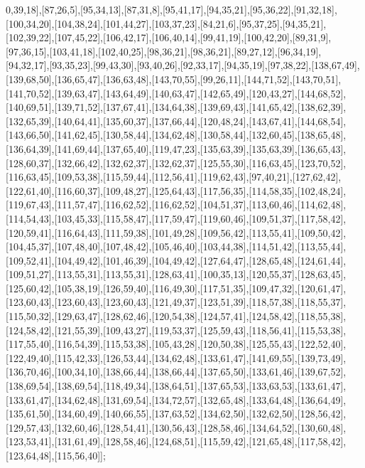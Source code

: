 0,39,18],[87,26,5],[95,34,13],[87,31,8],[95,41,17],[94,35,21],[95,36,22],[91,32,18],[100,34,20],[104,38,24],[101,44,27],[103,37,23],[84,21,6],[95,37,25],[94,35,21],[102,39,22],[107,45,22],[106,42,17],[106,40,14],[99,41,19],[100,42,20],[89,31,9],[97,36,15],[103,41,18],[102,40,25],[98,36,21],[98,36,21],[89,27,12],[96,34,19],[94,32,17],[93,35,23],[99,43,30],[93,40,26],[92,33,17],[94,35,19],[97,38,22],[138,67,49],[139,68,50],[136,65,47],[136,63,48],[143,70,55],[99,26,11],[144,71,52],[143,70,51],[141,70,52],[139,63,47],[143,64,49],[140,63,47],[142,65,49],[120,43,27],[144,68,52],[140,69,51],[139,71,52],[137,67,41],[134,64,38],[139,69,43],[141,65,42],[138,62,39],[132,65,39],[140,64,41],[135,60,37],[137,66,44],[120,48,24],[143,67,41],[144,68,54],[143,66,50],[141,62,45],[130,58,44],[134,62,48],[130,58,44],[132,60,45],[138,65,48],[136,64,39],[141,69,44],[137,65,40],[119,47,23],[135,63,39],[135,63,39],[136,65,43],[128,60,37],[132,66,42],[132,62,37],[132,62,37],[125,55,30],[116,63,45],[123,70,52],[116,63,45],[109,53,38],[115,59,44],[112,56,41],[119,62,43],[97,40,21],[127,62,42],[122,61,40],[116,60,37],[109,48,27],[125,64,43],[117,56,35],[114,58,35],[102,48,24],[119,67,43],[111,57,47],[116,62,52],[116,62,52],[104,51,37],[113,60,46],[114,62,48],[114,54,43],[103,45,33],[115,58,47],[117,59,47],[119,60,46],[109,51,37],[117,58,42],[120,59,41],[116,64,43],[111,59,38],[101,49,28],[109,56,42],[113,55,41],[109,50,42],[104,45,37],[107,48,40],[107,48,42],[105,46,40],[103,44,38],[114,51,42],[113,55,44],[109,52,41],[104,49,42],[101,46,39],[104,49,42],[127,64,47],[128,65,48],[124,61,44],[109,51,27],[113,55,31],[113,55,31],[128,63,41],[100,35,13],[120,55,37],[128,63,45],[125,60,42],[105,38,19],[126,59,40],[116,49,30],[117,51,35],[109,47,32],[120,61,47],[123,60,43],[123,60,43],[123,60,43],[121,49,37],[123,51,39],[118,57,38],[118,55,37],[115,50,32],[129,63,47],[128,62,46],[120,54,38],[124,57,41],[124,58,42],[118,55,38],[124,58,42],[121,55,39],[109,43,27],[119,53,37],[125,59,43],[118,56,41],[115,53,38],[117,55,40],[116,54,39],[115,53,38],[105,43,28],[120,50,38],[125,55,43],[122,52,40],[122,49,40],[115,42,33],[126,53,44],[134,62,48],[133,61,47],[141,69,55],[139,73,49],[136,70,46],[100,34,10],[138,66,44],[138,66,44],[137,65,50],[133,61,46],[139,67,52],[138,69,54],[138,69,54],[118,49,34],[138,64,51],[137,65,53],[133,63,53],[133,61,47],[133,61,47],[134,62,48],[131,69,54],[134,72,57],[132,65,48],[133,64,48],[136,64,49],[135,61,50],[134,60,49],[140,66,55],[137,63,52],[134,62,50],[132,62,50],[128,56,42],[129,57,43],[132,60,46],[128,54,41],[130,56,43],[128,58,46],[134,64,52],[130,60,48],[123,53,41],[131,61,49],[128,58,46],[124,68,51],[115,59,42],[121,65,48],[117,58,42],[123,64,48],[115,56,40]];

